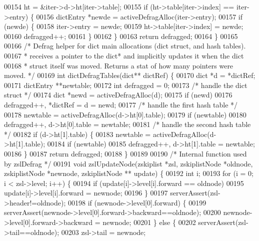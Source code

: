 \begin{DoxyCode}
00154     ht = &iter->d->ht[iter->table];
00155     \textcolor{keywordflow}{if} (ht->table[iter->index] == iter->entry) \{
00156         dictEntry *newde = activeDefragAlloc(iter->entry);
00157         \textcolor{keywordflow}{if} (newde) \{
00158             iter->entry = newde;
00159             ht->table[iter->index] = newde;
00160             defragged++;
00161         \}
00162     \}
00163     \textcolor{keywordflow}{return} defragged;
00164 \}
00165 
00166 \textcolor{comment}{/* Defrag helper for dict main allocations (dict struct, and hash tables).}
00167 \textcolor{comment}{ * receives a pointer to the dict* and implicitly updates it when the dict}
00168 \textcolor{comment}{ * struct itself was moved. Returns a stat of how many pointers were moved. */}
00169 \textcolor{keywordtype}{int} dictDefragTables(dict** dictRef) \{
00170     dict *d = *dictRef;
00171     dictEntry **newtable;
00172     \textcolor{keywordtype}{int} defragged = 0;
00173     \textcolor{comment}{/* handle the dict struct */}
00174     dict *newd = activeDefragAlloc(d);
00175     \textcolor{keywordflow}{if} (newd)
00176         defragged++, *dictRef = d = newd;
00177     \textcolor{comment}{/* handle the first hash table */}
00178     newtable = activeDefragAlloc(d->ht[0].table);
00179     \textcolor{keywordflow}{if} (newtable)
00180         defragged++, d->ht[0].table = newtable;
00181     \textcolor{comment}{/* handle the second hash table */}
00182     \textcolor{keywordflow}{if} (d->ht[1].table) \{
00183         newtable = activeDefragAlloc(d->ht[1].table);
00184         \textcolor{keywordflow}{if} (newtable)
00185             defragged++, d->ht[1].table = newtable;
00186     \}
00187     \textcolor{keywordflow}{return} defragged;
00188 \}
00189 
00190 \textcolor{comment}{/* Internal function used by zslDefrag */}
00191 \textcolor{keywordtype}{void} zslUpdateNode(zskiplist *zsl, zskiplistNode *oldnode, zskiplistNode *newnode, zskiplistNode **
      update) \{
00192     \textcolor{keywordtype}{int} i;
00193     \textcolor{keywordflow}{for} (i = 0; i < zsl->level; i++) \{
00194         \textcolor{keywordflow}{if} (update[i]->level[i].forward == oldnode)
00195             update[i]->level[i].forward = newnode;
00196     \}
00197     serverAssert(zsl->header!=oldnode);
00198     \textcolor{keywordflow}{if} (newnode->level[0].forward) \{
00199         serverAssert(newnode->level[0].forward->backward==oldnode);
00200         newnode->level[0].forward->backward = newnode;
00201     \} \textcolor{keywordflow}{else} \{
00202         serverAssert(zsl->tail==oldnode);
00203         zsl->tail = newnode;

\end{DoxyCode}
